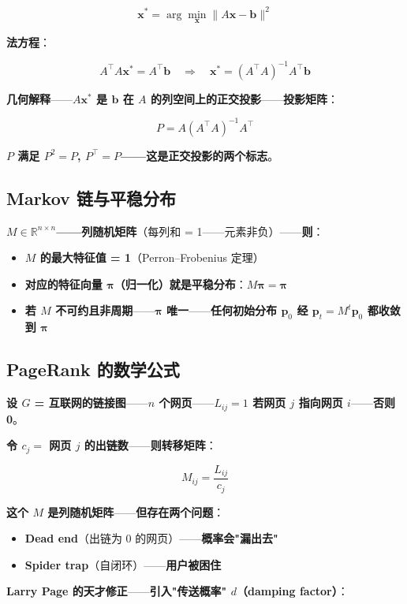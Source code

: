 \[
\bm{x}^* = \arg\min_{\bm{x}} \|A \bm{x} - \bm{b}\|^2
\]

\textbf{法方程}：

\[
A^{\!\top} A \bm{x}^* = A^{\!\top} \bm{b} \quad \Longrightarrow \quad \bm{x}^* = (A^{\!\top} A)^{-1} A^{\!\top} \bm{b}
\]

\textbf{几何解释}——\textbf{$A \bm{x}^*$ 是 $\bm{b}$ 在 $A$ 的列空间上的正交投影}——\textbf{投影矩阵}：

\[
P = A (A^{\!\top} A)^{-1} A^{\!\top}
\]

\textbf{$P$ 满足 $P^2 = P$, $P^{\!\top} = P$——这是正交投影的两个标志}。

\subsection{Markov 链与平稳分布}

\textbf{$M \in \mathbb{R}^{n \times n}$——列随机矩阵}（每列和 = 1——元素非负）——\textbf{则}：

\begin{itemize}
\item \textbf{$M$ 的最大特征值 = 1}（Perron--Frobenius 定理）
\item \textbf{对应的特征向量 $\bm{\pi}$（归一化）就是平稳分布}：$M \bm{\pi} = \bm{\pi}$
\item \textbf{若 $M$ 不可约且非周期}——\textbf{$\bm{\pi}$ 唯一}——\textbf{任何初始分布 $\bm{p}_0$ 经 $\bm{p}_t = M^t \bm{p}_0$ 都收敛到 $\bm{\pi}$}
\end{itemize}

\subsection{PageRank 的数学公式}

\textbf{设 $G$ = 互联网的链接图}——\textbf{$n$ 个网页}——\textbf{$L_{ij} = 1$ 若网页 $j$ 指向网页 $i$}——\textbf{否则 0}。

\textbf{令 $c_j = $ 网页 $j$ 的出链数}——\textbf{则转移矩阵}：

\[
M_{ij} = \frac{L_{ij}}{c_j}
\]

\textbf{这个 $M$ 是列随机矩阵}——\textbf{但存在两个问题}：
\begin{itemize}
\item \textbf{Dead end}（出链为 0 的网页）——\textbf{概率会"漏出去"}
\item \textbf{Spider trap}（自闭环）——\textbf{用户被困住}
\end{itemize}

\textbf{Larry Page 的天才修正}——\textbf{引入"传送概率" $d$（damping factor）}：


